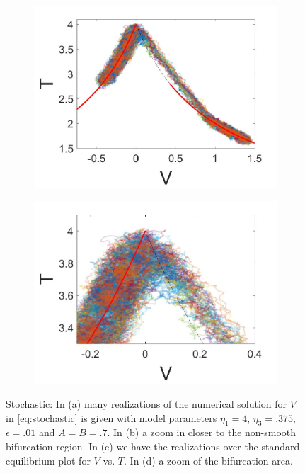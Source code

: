\begin{figure}[H]
\begin{subfigure}{.5\textwidth}
 \caption{}
\end{subfigure}
\begin{subfigure}{.5\textwidth}
 \centering
 \includegraphics[width=\linewidth]{conclusion/stochastic_T.jpg}
 \caption{}
\end{subfigure}%
\begin{subfigure}{.5\textwidth}
 \centering
 \includegraphics[width=\linewidth]{conclusion/stochastic_T_zoom.jpg}
 \caption{}
\end{subfigure}
\caption{Stochastic: In (a) many realizations of the numerical solution for $V$ in \eqref{eq:stochastic} is given with model parameters $\eta_1=4$, $\eta_3=.375$, $\epsilon=.01$ and $A=B=.7$. In (b) a zoom in closer to the non-smooth bifurcation region. In (c) we have the realizations over the standard equilibrium plot for $V$ vs. $T$. In (d) a zoom of the bifurcation area.}
\label{fig:stochastic}
\end{figure}